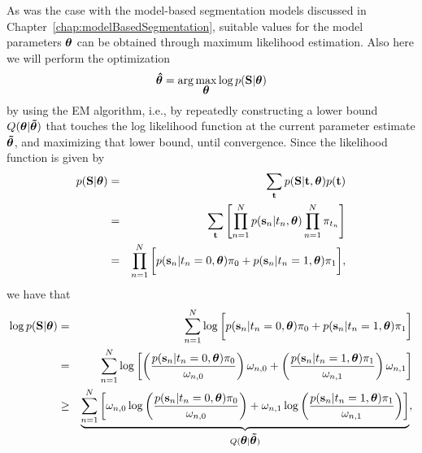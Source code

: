 \documentclass[10pt,twoside]{book}
\begin{document}
As was the case with the model-based segmentation models discussed in Chapter~\ref{chap:modelBasedSegmentation}, suitable values for the model parameters ${\mbox{\boldmath {${\theta}$}}}$ can be 
obtained through maximum likelihood estimation. Also here we will perform the optimization 
\begin{displaymath}
  {\mbox{\boldmath {${\hat{\theta}}$}}} = \arg \max_{{\mbox{\boldmath {${\theta}$}}}} \log p( \mathbf{S} | {\mbox{\boldmath {${\theta}$}}} )
\end{displaymath}
by using the EM algorithm, i.e., by repeatedly constructing a lower bound $Q({\mbox{\boldmath {${\theta}$}}}|{\mbox{\boldmath {${\tilde{\theta}}$}}})$ that touches the log likelihood function 
at the current parameter estimate ${\mbox{\boldmath {${\tilde{\theta}}$}}}$, and maximizing that lower bound, until convergence.
Since the likelihood function is given by
\begin{eqnarray}
  p( \mathbf{S} | {\mbox{\boldmath {${\theta}$}}} ) & = & \sum_{\mathbf{t}} p( \mathbf{S} | \mathbf{t}, {\mbox{\boldmath {${\theta}$}}} ) p( \mathbf{t} ) \nonumber \\
                                & = & \sum_{\mathbf{t}} \left[ \prod_{n=1}^N p( \mathbf{s}_n | t_n, {\mbox{\boldmath {${\theta}$}}} ) \prod_{n=1}^N \pi_{t_n} \right] \nonumber \\
                                & = & \prod_{n=1}^N \bigg[ p( \mathbf{s}_n | t_n=0, {\mbox{\boldmath {${\theta}$}}} ) \pi_0 + p( \mathbf{s}_n | t_n=1, {\mbox{\boldmath {${\theta}$}}} ) \pi_1 \bigg], \nonumber
\end{eqnarray}
we have that 
\begin{eqnarray}
  \log p( \mathbf{S} | {\mbox{\boldmath {${\theta}$}}} )  & = & \sum_{n=1}^N \log \bigg[ p( \mathbf{s}_n | t_n=0, {\mbox{\boldmath {${\theta}$}}} ) \pi_0 + p( \mathbf{s}_n | t_n=1, {\mbox{\boldmath {${\theta}$}}} ) \pi_1 \bigg] \nonumber \\
                                      & = & \sum_{n=1}^N \log \left[ \left( \frac{p( \mathbf{s}_n | t_n=0, {\mbox{\boldmath {${\theta}$}}} ) \pi_0}{\omega_{n,0}} \right) \omega_{n,0} + 
                                                                     \left( \frac{p( \mathbf{s}_n | t_n=1, {\mbox{\boldmath {${\theta}$}}} ) \pi_1}{\omega_{n,1}} \right) \omega_{n,1} \right] \nonumber \\
                                      & \geq & \underbrace{ 
                                                \sum_{n=1}^N \left[ 
                                                                \omega_{n,0} \log \left( \frac{p( \mathbf{s}_n | t_n=0, {\mbox{\boldmath {${\theta}$}}} ) \pi_0}{\omega_{n,0}} \right) + 
                                                                \omega_{n,1} \log \left( \frac{p( \mathbf{s}_n | t_n=1, {\mbox{\boldmath {${\theta}$}}} ) \pi_1}{\omega_{n,1}} \right)
                                                              \right] 
                                               }_{Q({\mbox{\boldmath {${\theta}$}}} | {\mbox{\boldmath {${\tilde{\theta}}$}}})},
                                      \nonumber
\end{eqnarray}
\end{document}

